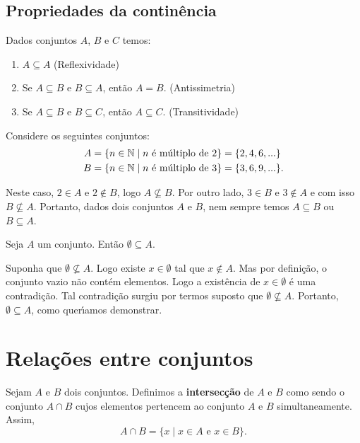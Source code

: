\subsection{Propriedades da contin{\^e}ncia}
Dados conjuntos $A$, $B$ e $C$ temos:
\begin{enumerate}
\item $A\subseteq A$ (Reflexividade)
\item Se $A\subseteq B \mbox{ e } B\subseteq A$, ent{\~a}o $A=B$. (Antissimetria)
\item Se $A\subseteq B$ e $B\subseteq C$, ent{\~a}o $A\subseteq C$. (Transitividade)
\end{enumerate}

Considere os seguintes conjuntos:
\begin{align*}
	A &= \{ n \in \mathbb{N} \mid n \mbox{ {\'e} m{\'u}ltiplo de } 2\} = \{2,4,6,...\}\\
	B &= \{n \in \mathbb{N} \mid n \mbox{ {\'e} m{\'u}ltiplo de } 3\} = \{3,6,9,...\}.
\end{align*}


Neste caso, $2 \in A$ e $2 \notin B$, logo $A \nsubseteq B$. Por outro lado, $3 \in B$ e $3 \notin A$ e com isso $B \nsubseteq A$. Portanto, dados dois conjuntos $A$ e $B$, nem sempre temos $A \subseteq B$ ou $B \subseteq A$.

\begin{proposicao} 
	Seja $A$ um conjunto. Ent{\~a}o $ \emptyset \subseteq A$.
\end{proposicao}
\begin{prova}
	Suponha que $\emptyset \nsubseteq A$. Logo existe $x \in \emptyset$ tal que $x \notin A$. Mas por defini{\c c}{\~a}o, o conjunto vazio n{\~a}o cont{\'e}m elementos. Logo a exist\^encia de $x \in \emptyset$ {\'e} uma contradi{\c c}{\~a}o. Tal contradi\c{c}\~ao surgiu por termos suposto que $\emptyset \nsubseteq A$. Portanto, $\emptyset \subseteq A$, como quer{\'\i}amos demonstrar.
\end{prova}

\section{Rela{\c c}{\~o}es entre conjuntos}

\begin{definicao}[Intersec{\c c}{\~a}o]
Sejam $A$ e $B$ dois conjuntos. Definimos a \textbf{intersec{\c c}{\~a}o} de $A$ e $B$ como sendo o conjunto $A \cap B$ cujos elementos pertencem ao conjunto $A$ e $B$ simultaneamente. Assim,
\[
A \cap B = \{x \mid x \in A\mbox{ e }  x \in B\}.
\]
\end{definicao}

